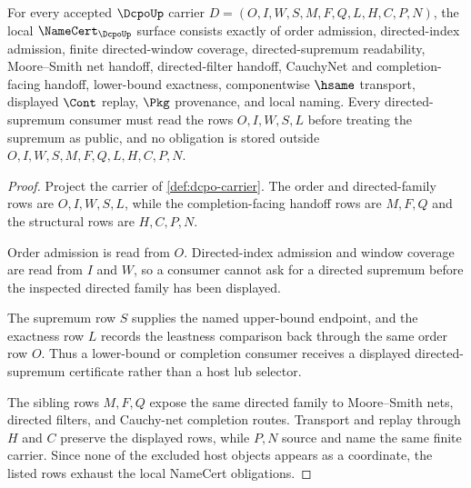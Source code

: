 \begin{theorem}
\label{thm:dcpo-namecert-obligations}
For every accepted $\DcpoUp$ carrier $D=(O,I,W,S,M,F,Q,L,H,C,P,N)$, the local $\NameCert_{\DcpoUp}$ surface consists exactly of order admission, directed-index admission, finite directed-window coverage, directed-supremum readability, Moore--Smith net handoff, directed-filter handoff, CauchyNet and completion-facing handoff, lower-bound exactness, componentwise $\hsame$ transport, displayed $\Cont$ replay, $\Pkg$ provenance, and local naming. Every directed-supremum consumer must read the rows $O,I,W,S,L$ before treating the supremum as public, and no obligation is stored outside $O,I,W,S,M,F,Q,L,H,C,P,N$.
\end{theorem}
\begin{proof}
Project the carrier of \autoref{def:dcpo-carrier}. The order and directed-family rows are $O,I,W,S,L$, while the completion-facing handoff rows are $M,F,Q$ and the structural rows are $H,C,P,N$.

Order admission is read from $O$. Directed-index admission and window coverage are read from $I$ and $W$, so a consumer cannot ask for a directed supremum before the inspected directed family has been displayed.

The supremum row $S$ supplies the named upper-bound endpoint, and the exactness row $L$ records the leastness comparison back through the same order row $O$. Thus a lower-bound or completion consumer receives a displayed directed-supremum certificate rather than a host lub selector.

The sibling rows $M,F,Q$ expose the same directed family to Moore--Smith nets, directed filters, and Cauchy-net completion routes. Transport and replay through $H$ and $C$ preserve the displayed rows, while $P,N$ source and name the same finite carrier. Since none of the excluded host objects appears as a coordinate, the listed rows exhaust the local NameCert obligations.
\end{proof}


